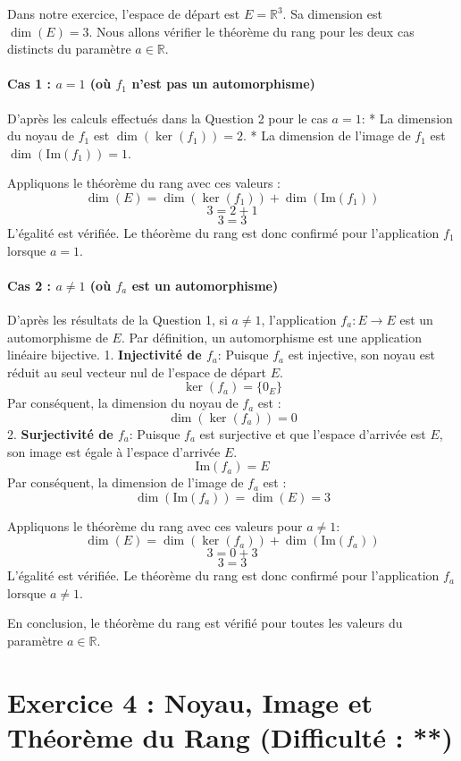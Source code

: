 \documentclass{report}
\begin{document}
Dans notre exercice, l'espace de départ est $E = \mathbb{R}^3$. Sa dimension est $\dim(E) = 3$.
Nous allons vérifier le théorème du rang pour les deux cas distincts du paramètre $a \in \mathbb{R}$.

\subsubsection*{Cas 1 : $a=1$ (où $f_1$ n'est pas un automorphisme)}

D'après les calculs effectués dans la Question 2 pour le cas $a=1$:
*   La dimension du noyau de $f_1$ est $\dim(\ker(f_1)) = 2$.
*   La dimension de l'image de $f_1$ est $\dim(\text{Im}(f_1)) = 1$.

Appliquons le théorème du rang avec ces valeurs :
$$ \dim(E) = \dim(\ker(f_1)) + \dim(\text{Im}(f_1)) $$
$$ 3 = 2 + 1 $$
$$ 3 = 3 $$
L'égalité est vérifiée. Le théorème du rang est donc confirmé pour l'application $f_1$ lorsque $a=1$.

\subsubsection*{Cas 2 : $a \neq 1$ (où $f_a$ est un automorphisme)}

D'après les résultats de la Question 1, si $a \neq 1$, l'application $f_a: E \to E$ est un automorphisme de $E$.
Par définition, un automorphisme est une application linéaire bijective.
1.  \textbf{Injectivité de $f_a$}: Puisque $f_a$ est injective, son noyau est réduit au seul vecteur nul de l'espace de départ $E$.
    $$ \ker(f_a) = \{0_E\} $$
    Par conséquent, la dimension du noyau de $f_a$ est :
    $$ \dim(\ker(f_a)) = 0 $$
2.  \textbf{Surjectivité de $f_a$}: Puisque $f_a$ est surjective et que l'espace d'arrivée est $E$, son image est égale à l'espace d'arrivée $E$.
    $$ \text{Im}(f_a) = E $$
    Par conséquent, la dimension de l'image de $f_a$ est :
    $$ \dim(\text{Im}(f_a)) = \dim(E) = 3 $$

Appliquons le théorème du rang avec ces valeurs pour $a \neq 1$:
$$ \dim(E) = \dim(\ker(f_a)) + \dim(\text{Im}(f_a)) $$
$$ 3 = 0 + 3 $$
$$ 3 = 3 $$
L'égalité est vérifiée. Le théorème du rang est donc confirmé pour l'application $f_a$ lorsque $a \neq 1$.

En conclusion, le théorème du rang est vérifié pour toutes les valeurs du paramètre $a \in \mathbb{R}$.

\newpage

\chapter*{Exercice 4 : Noyau, Image et Théorème du Rang (Difficulté : **)}
\end{document}
